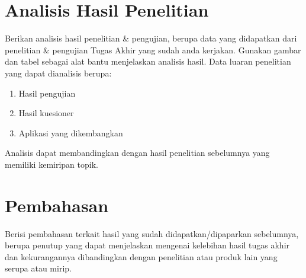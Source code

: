 \section{Analisis Hasil Penelitian} \label{IV.Analisis}
Berikan analisis hasil penelitian \& pengujian, berupa data yang didapatkan dari penelitian \& pengujian Tugas Akhir yang sudah anda kerjakan. Gunakan gambar dan tabel sebagai alat bantu menjelaskan analisis hasil. Data luaran penelitian yang dapat dianalisis berupa: \par
\begin{enumerate}[noitemsep]
	\item Hasil pengujian
	\item Hasil kuesioner
	\item Aplikasi yang dikembangkan
\end{enumerate}
Analisis dapat membandingkan dengan hasil penelitian sebelumnya yang memiliki kemiripan topik. \par

\section{Pembahasan} \label{IV.Bahas}
Berisi pembahasan terkait hasil yang sudah didapatkan/dipaparkan sebelumnya, berupa penutup yang dapat menjelaskan mengenai kelebihan hasil tugas akhir dan kekurangannya dibandingkan dengan penelitian atau produk lain yang serupa atau mirip. \par